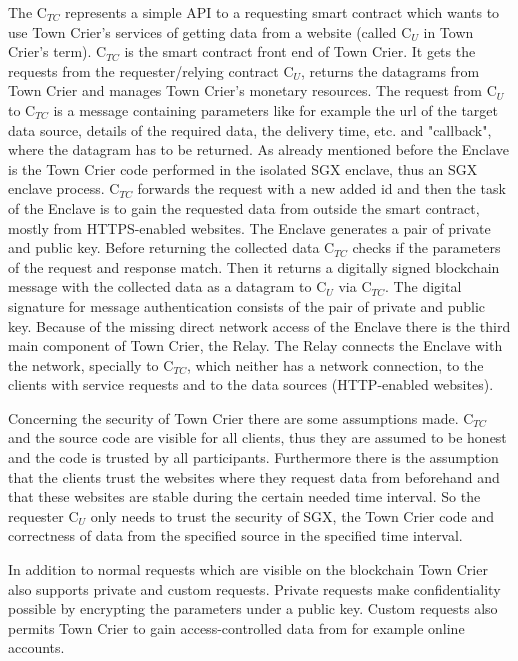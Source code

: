 \documentclass[conference]{IEEEtran}
\begin{document}
The C$_{TC}$ represents a simple API to a requesting smart contract which wants to use Town Crier's services of getting data from a website (called C$_{U}$ in Town Crier's term). C$_{TC}$ is the smart contract front end of Town Crier. It gets the requests from the requester/relying contract C$_{U}$, returns the datagrams from Town Crier and manages Town Crier's monetary resources. The request from C$_{U}$ to C$_{TC}$ is a message containing parameters like for example the url of the target data source, details of the required data, the delivery time, etc. and "callback", where the datagram has to be returned. As already mentioned before the Enclave is the Town Crier code performed in the isolated SGX enclave, thus an SGX enclave process. C$_{TC}$ forwards the request with a new added id and then the task of the Enclave is to gain the requested data from outside the smart contract, mostly from HTTPS-enabled websites. The Enclave generates a pair of private and public key. Before returning the collected data C$_{TC}$ checks if the parameters of the request and response match. Then it returns a digitally signed blockchain message with the collected data as a datagram to C$_{U}$ via C$_{TC}$. The digital signature for message authentication consists of the pair of private and public key. Because of the missing direct network access of the Enclave there is the third main component of Town Crier, the Relay. The Relay connects the Enclave with the network, specially to C$_{TC}$, which neither has a network connection, to the clients with service requests and to the data sources (HTTP-enabled websites). \cite{Zhang2016} \par 
Concerning the security of Town Crier there are some assumptions made. C$_{TC}$ and the source code are visible for all clients, thus they are assumed to be honest and the code is trusted by all participants. Furthermore there is the assumption that the clients trust the websites where they request data from beforehand and that these websites are stable during the certain needed time interval. So the requester C$_{U}$ only needs to trust the security of SGX, the Town Crier code and correctness of data from the specified source in the specified time interval. \cite{Zhang2016} \par 
In addition to normal requests which are visible on the blockchain Town Crier also supports private and custom requests. Private requests make confidentiality possible by encrypting the parameters under a public key. Custom requests also permits Town Crier to gain access-controlled data from for example online accounts. \cite{Zhang2016} \par 
\end{document}
